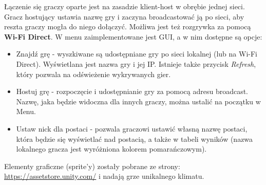 \documentclass[]{report}
\begin{document}
Łączenie się graczy oparte jest na zasadzie klient-host w obrębie jednej sieci. Gracz hostujący ustawia nazwę gry i zaczyna broadcastować ją po sieci, aby reszta graczy mogła do niego dołączyć. Możliwa jest też rozgrywka za pomocą \textbf{Wi-Fi Direct}. W menu zaimplementowane jest GUI, a w nim dostępne są opcje:
\begin{itemize}
	\item Znajdź grę - wyszkiwane są udostępniane gry po sieci lokalnej (lub na Wi-Fi Direct). Wyświetlana jest nazwa gry i jej IP. Istnieje także przycisk \textit{Refresh}, który pozwala na odświeżenie wykrywanych gier.
	\item Hostuj grę - rozpoczęcie i udostępnianie gry za pomocą adresu broadcast. Nazwę, jaka będzie widoczna dla innych graczy, można ustalić na początku w Menu.
	\item Ustaw nick dla postaci - pozwala graczowi ustawić własną nazwę postaci, która będzie się wyświetlać nad postacią, a także w tabeli wyników (nazwa lokalnego gracza jest wyróżniona kolorem pomarańczowym).
\end{itemize}
Elementy graficzne (sprite'y) zostały pobrane ze strony: 
\href{https://assetstore.unity.com/}{https://assetstore.unity.com/} i nadają grze unikalnego klimatu.
\end{document}
